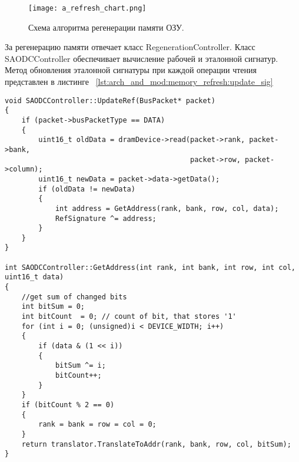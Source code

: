 \begin{figure}[ht]
\centering
  \texttt{[image: a\_refresh\_chart.png]}  
  \caption{ Схема алгоритма регенерации памяти ОЗУ.}
  \label{fig:arch_and_mod:memory_refresh:refresh_chart}
\end{figure}

За регенерацию памяти отвечает класс RegenerationController. Класс SAODCController обеспечивает вычисление рабочей и эталонной сигнатур. Метод обновления эталонной сигнатуры при каждой операции чтения представлен в листинге ~\ref{lst:arch_and_mod:memory_refresh:update_sig}

\begin{lstlisting}[style=cplusplusstyle, caption={Обновление эталонной сигнатуры ОЗУ}, label=lst:arch_and_mod:memory_refresh:update_sig]
void SAODCController::UpdateRef(BusPacket* packet)
{
    if (packet->busPacketType == DATA)
    {
        uint16_t oldData = dramDevice->read(packet->rank, packet->bank,
                                            packet->row, packet->column);
        uint16_t newData = packet->data->getData();
        if (oldData != newData)
        {
            int address = GetAddress(rank, bank, row, col, data);
            RefSignature ^= address;       
        }
    }
}

int SAODCController::GetAddress(int rank, int bank, int row, int col, uint16_t data)
{
    //get sum of changed bits
    int bitSum = 0;
    int bitCount  = 0; // count of bit, that stores '1'
    for (int i = 0; (unsigned)i < DEVICE_WIDTH; i++)
    {
        if (data & (1 << i))
        {
            bitSum ^= i;
            bitCount++;
        }
    }    
    if (bitCount % 2 == 0)
    {
        rank = bank = row = col = 0;
    }
    return translator.TranslateToAddr(rank, bank, row, col, bitSum);
}
\end{lstlisting} 

